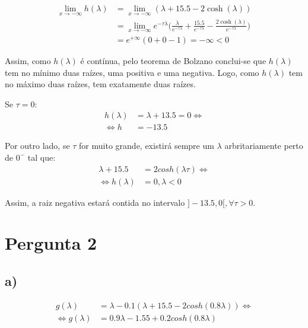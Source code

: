 \documentclass[a4paper, 12pt]{article}
\begin{document}
	\begin{equation}
	\begin{split}
		\lim_{x \to -\infty} h(\lambda)
		&= \lim_{x \to -\infty} (\lambda + 15.5 - 2\cosh(\lambda)) \\
		&= \lim_{x \to -\infty} e^{-\tau\lambda} \bigg(\frac{\lambda}{e^{-\tau\lambda}} + \frac{15.5}{e^{-\tau\lambda}} - \frac{2\cosh(\lambda)}{e^{-\tau\lambda}}\bigg) \\
		&= e^{+\infty} (0 + 0 - 1) = -\infty < 0
	\end{split}
	\end{equation}

	\par
	Assim, como $h(\lambda)$ é contínua, pelo teorema de Bolzano conclui-se que $h(\lambda)$ tem no mínimo duas raízes, uma positiva e uma negativa. Logo, como $h(\lambda)$ tem no máximo duas raízes, tem exatamente duas raízes.
	\par
	Se $\tau = 0$:
	\begin{equation}
	\begin{split}
		h(\lambda) &= \lambda + 13.5 = 0 \Leftrightarrow \\
		\Leftrightarrow h &= -13.5
	\end{split}
	\end{equation}
	\par
	Por outro lado, se $\tau$ for muito grande, existirá sempre um $\lambda$ arbritariamente perto de $0^-$ tal que:
	\begin{equation}
	\begin{split}
		\lambda + 15.5 &= 2cosh(\lambda\tau) \Leftrightarrow \\
		\Leftrightarrow h(\lambda) &= 0, \lambda < 0
	\end{split}
	\end{equation}
	\par
	Assim, a raiz negativa estará contida no intervalo $]-13.5, 0[, \forall \tau > 0$.


\section{Pergunta 2}
\subsection*{a)}
	\begin{equation} \label{2a}
	\begin{split}
		g(\lambda) &= \lambda - 0.1(\lambda + 15.5 - 2cosh(0.8\lambda)) \Leftrightarrow \\
		\Leftrightarrow g(\lambda) &= 0.9\lambda - 1.55 + 0.2cosh(0.8\lambda)
	\end{split}
	\end{equation}
\end{document}
